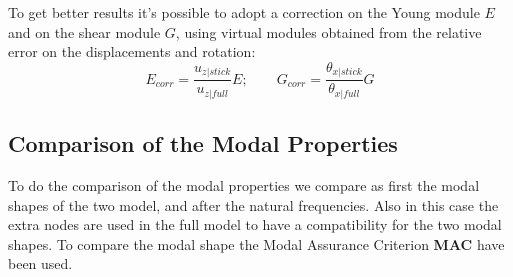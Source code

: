 To get better results it's possible to adopt a correction on the Young module $E$ and on the shear module $G$, using virtual modules obtained from the relative error on the displacements and rotation:
\begin{equation*}
E_{corr}=\frac{u_{z|stick}}{u_{z|full}}E;\qquad G_{corr}=\frac{\theta_{x|stick}}{\theta_{x|full}}G
\end{equation*}
\subsection{Comparison of the Modal Properties}
To do the comparison of the modal properties we compare as first the modal shapes of the two model, and after the natural frequencies. Also in this case the extra nodes are used in the full model to have a compatibility for the two modal shapes. To compare the modal shape the Modal Assurance Criterion \textbf{MAC} have been used.
